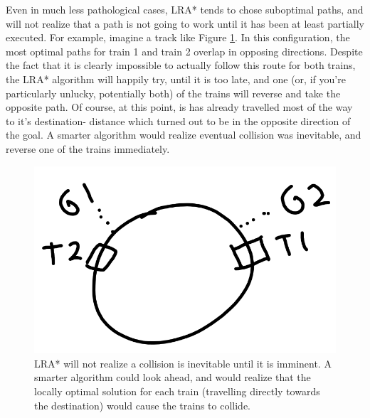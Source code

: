 \documentclass{article}
\begin{document}
Even in much less pathological cases, LRA* tends to chose suboptimal paths,
and will not realize that a path is not going to work until it has been at
least partially executed. For example, imagine a track like
Figure \ref{fig:LRA*-suboptimal}. In this configuration, the most optimal
paths for train 1 and train 2 overlap in opposing directions. Despite the
fact that it is clearly impossible to actually follow this route for both
trains, the LRA* algorithm will happily try, until it is too late, and one
(or, if you're particularly unlucky, potentially both) of the trains will
reverse and take the opposite path. Of course, at this point, is has already
travelled most of the way to it's destination- distance which turned out to
be in the opposite direction of the goal. A smarter algorithm would realize
eventual collision was inevitable, and reverse one of the trains immediately.
\begin{figure}
\caption{LRA* will not realize a collision is inevitable until it is imminent.
A smarter algorithm could look ahead, and would realize that the locally optimal
solution for each train (travelling directly towards the destination) would
cause the trains to collide.}
\label{fig:LRA*-suboptimal}
\includegraphics[width=\linewidth]{LRA*-suboptimal.png}
\end{figure}
\end{document}
